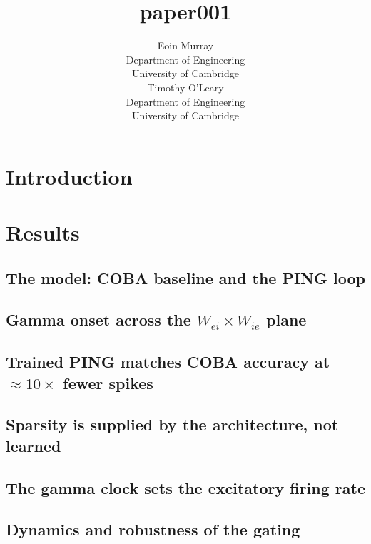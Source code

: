 \documentclass{article}
\title{paper001}
\author{
  Eoin Murray \\
  Department of Engineering \\
  University of Cambridge \\
  \And
  Timothy O'Leary \\
  Department of Engineering \\
  University of Cambridge \\
}
\begin{document}
\maketitle

\begin{abstract}
\end{abstract}

\section{Introduction}

\section{Results}

\subsection{The model: COBA baseline and the PING loop}
\label{claim:1}

\subsection{\texorpdfstring{Gamma onset across the $W_{ei} \times W_{ie}$ plane}{Gamma onset across the W_ei x W_ie plane}}
\label{claim:2}

\subsection{\texorpdfstring{Trained PING matches COBA accuracy at $\approx 10\times$ fewer spikes}{Trained PING matches COBA accuracy at approximately 10x fewer spikes}}
\label{claim:3}

\subsection{Sparsity is supplied by the architecture, not learned}
\label{claim:4}

\subsection{The gamma clock sets the excitatory firing rate}
\label{claim:5}

\subsection{Dynamics and robustness of the gating}
\label{claim:6}
\end{document}
